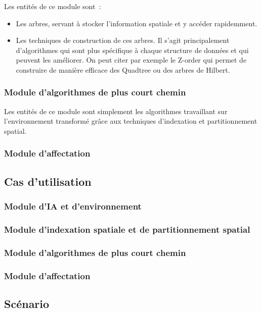 Les entités de ce module sont~:
\begin{itemize}
\setlength{\itemsep}{5pt}
\item Les arbres, servant à stocker l'information spatiale et y accéder rapidemment.
\item Les techniques de construction de ces arbres. Il s'agit principalement d'algorithmes qui sont plus spécifique à chaque structure de données et qui peuvent les améliorer. On peut citer par exemple le Z-order qui permet de construire de manière efficace des Quadtree ou des arbres de Hilbert.
\end{itemize}

%
\subsubsection{Module d'algorithmes de plus court chemin}

Les entités de ce module sont simplement les algorithmes travaillant sur l'environnement transformé grâce aux techniques d'indexation et partitionnement spatial.

%
\subsubsection{Module d'affectation}

%
\subsection{Cas d'utilisation}

\subsubsection{Module d'IA et d'environnement}
\subsubsection{Module d'indexation spatiale et de partitionnement spatial}
\subsubsection{Module d'algorithmes de plus court chemin}
\subsubsection{Module d'affectation}

%
\subsection{Scénario}

